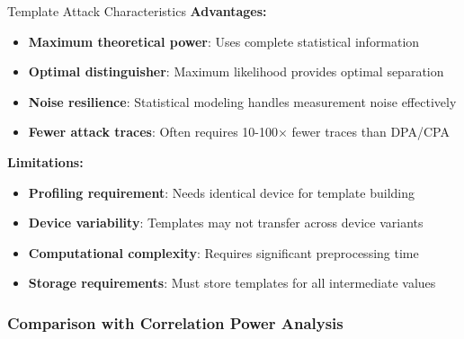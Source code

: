 \documentclass[11pt,a4paper]{article}
\theoremstyle{definition}
\begin{document}
\begin{attackbox}{Template Attack Characteristics}
\textbf{Advantages:}
\begin{itemize}
    \item \textbf{Maximum theoretical power}: Uses complete statistical information
    \item \textbf{Optimal distinguisher}: Maximum likelihood provides optimal separation
    \item \textbf{Noise resilience}: Statistical modeling handles measurement noise effectively
    \item \textbf{Fewer attack traces}: Often requires 10-100× fewer traces than DPA/CPA
\end{itemize}

\textbf{Limitations:}
\begin{itemize}
    \item \textbf{Profiling requirement}: Needs identical device for template building
    \item \textbf{Device variability}: Templates may not transfer across device variants
    \item \textbf{Computational complexity}: Requires significant preprocessing time
    \item \textbf{Storage requirements}: Must store templates for all intermediate values
\end{itemize}
\end{attackbox}

\subsubsection{Comparison with Correlation Power Analysis}
\end{document}
